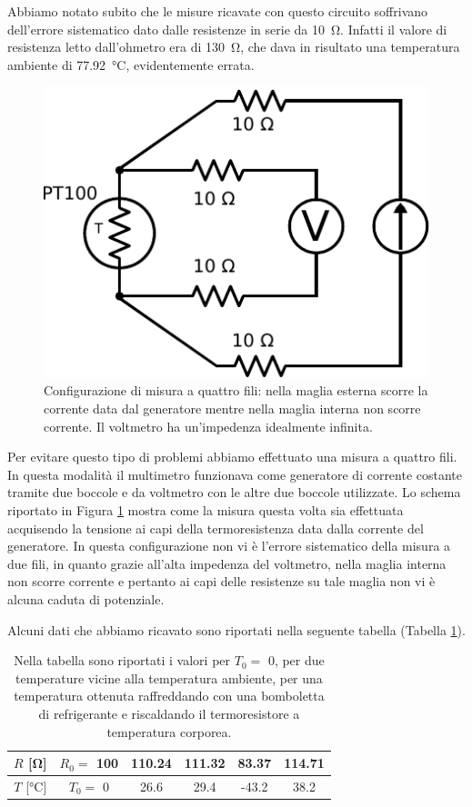 Abbiamo notato subito che le misure ricavate con questo circuito soffrivano dell'errore sistematico dato dalle resistenze in serie da \SI{10}{\ohm}.
Infatti il valore di resistenza letto dall'ohmetro era di \SI{130}{\ohm}, che dava in risultato una temperatura ambiente di \SI{77,92}{\degreeCelsius}, evidentemente errata.\\

\begin{figure}
\centering
\includegraphics[width=.3\textwidth]{../E05/latex/c_PT100_4wire.pdf}
\caption{Configurazione di misura a quattro fili: nella maglia esterna scorre la corrente data dal generatore mentre nella maglia interna non scorre corrente. Il voltmetro ha un'impedenza idealmente infinita.}
\label{cir5:4wire}
\end{figure}
Per evitare questo tipo di problemi abbiamo effettuato una misura a quattro fili.
In questa modalità il multimetro funzionava come generatore di corrente costante tramite due boccole e da voltmetro con le altre due boccole utilizzate.
Lo schema riportato in Figura \ref{cir5:4wire} mostra come la misura questa volta sia effettuata acquisendo la tensione ai capi della termoresistenza data dalla corrente del generatore.
In questa configurazione non vi è l'errore sistematico della misura a due fili, in quanto grazie all'alta impedenza del voltmetro, nella maglia interna non scorre corrente e pertanto ai capi delle resistenze su tale maglia non vi è alcuna caduta di potenziale.

Alcuni dati che abbiamo ricavato sono riportati nella seguente tabella (Tabella \ref{tab5:pt100}).
\begin{table}[hc]
{\renewcommand{\arraystretch}{1.4}%
\begin{tabular}{c|c c c c c}
$R$ [\si{\ohm}] 		& $R_0 =$ 100 	& 110.24 & 111.32 & 83.37 & 114.71\\ 
\hline 
$T$ [\si{\degreeCelsius}] 	& $T_0 =$ 0 	& 26.6 & 29.4 & -43.2 & 38.2 \\ 
\end{tabular}}
\caption{Nella tabella sono riportati i valori per $T_0 =$ 0, per due temperature vicine alla temperatura ambiente, per una temperatura ottenuta raffreddando con una bomboletta di refrigerante e riscaldando il termoresistore a temperatura corporea.}
\label{tab5:pt100}
\end{table}
